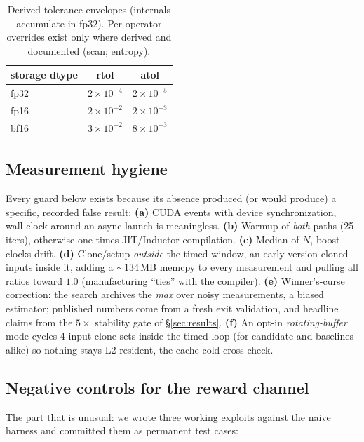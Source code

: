 \documentclass[10pt]{article}
\begin{document}
\begin{table}[t]
\centering\small
{\setlength{\tabcolsep}{14pt}%
\begin{tabular}{lcc}
\toprule
storage dtype & rtol & atol\\
\midrule
fp32 & $2\times10^{-4}$ & $2\times10^{-5}$\\
fp16 & $2\times10^{-2}$ & $2\times10^{-3}$\\
bf16 & $3\times10^{-2}$ & $8\times10^{-3}$\\
\bottomrule
\end{tabular}}
\caption{Derived tolerance envelopes (internals accumulate in fp32). Per-operator
overrides exist only where derived and documented (scan; entropy).}\label{tab:tol}
\end{table}

\subsection{Measurement hygiene}\label{sec:hygiene}

Every guard below exists because its absence produced (or would produce) a specific,
recorded false result:
\textbf{(a)} CUDA events with device synchronization, wall-clock around an async launch
is meaningless. \textbf{(b)} Warmup of \emph{both} paths (25 iters), otherwise one times
JIT/Inductor compilation. \textbf{(c)} Median-of-$N$, boost clocks drift.
\textbf{(d)} Clone/setup \emph{outside} the timed window, an early version cloned
inputs inside it, adding a $\sim$134\,MB memcpy to every measurement and pulling all
ratios toward $1.0$ (manufacturing ``ties'' with the compiler). \textbf{(e)} Winner's-curse
correction: the search archives the \emph{max} over noisy measurements, a biased
estimator; published numbers come from a fresh exit validation, and headline claims from
the $5\times$ stability gate of \S\ref{sec:results}. \textbf{(f)} An opt-in
\emph{rotating-buffer} mode cycles 4 input clone-sets inside the timed loop (for candidate
and baselines alike) so nothing stays L2-resident, the cache-cold cross-check.

\subsection{Negative controls for the reward channel}\label{sec:antigaming}

The part that is unusual: we wrote three working exploits against the naive
harness and committed them as permanent test cases:
\end{document}
